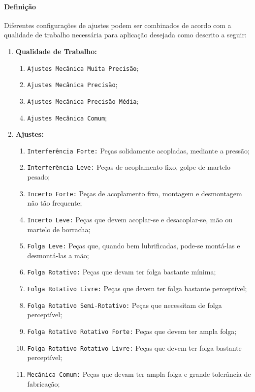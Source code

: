 \documentclass{article}
\begin{document}
            \paragraph{Definição}Diferentes configurações de ajustes podem ser combinados de acordo com a qualidade de trabalho necessária para aplicação desejada como descrito a seguir:
                \begin{enumerate}[noitemsep]
                    \item \textbf{Qualidade de Trabalho:}
                        \begin{enumerate}[noitemsep]
                            \item \texttt{Ajustes Mecânica Muita Precisão};
                            \item \texttt{Ajustes Mecânica Precisão};
                            \item \texttt{Ajustes Mecânica Precisão Média};
                            \item \texttt{Ajustes Mecânica Comum};
                        \end{enumerate}
                    \item \textbf{Ajustes:}
                        \begin{enumerate}[noitemsep]
                            \item \texttt{Interferência Forte:} Peças solidamente acopladas, mediante a pressão;
                            \item \texttt{Interferência Leve:} Peças de acoplamento fixo, golpe de martelo pesado;\vspace{5mm}
                            \item \texttt{Incerto Forte:} Peças de acoplamento fixo, montagem e desmontagem não tão frequente;
                            \item \texttt{Incerto Leve:} Peças que devem acoplar-se e desacoplar-se, mão ou martelo de borracha;\vspace{5mm}
                            \item \texttt{Folga Leve:} Peças que, quando bem lubrificadas, pode-se montá-las e desmontá-las a mão;
                            \item \texttt{Folga Rotativo:} Peças que devam ter folga bastante mínima;
                            \item \texttt{Folga Rotativo Livre:} Peças que devem ter folga bastante perceptível;
                            \item \texttt{Folga Rotativo Semi-Rotativo:} Peças que necessitam de folga perceptível;
                            \item \texttt{Folga Rotativo Rotativo Forte:} Peças que devem ter ampla folga;
                            \item \texttt{Folga Rotativo Rotativo Livre:} Peças que devem ter folga bastante perceptível;\vspace{5mm}
                            \item \texttt{Mecânica Comum:} Peças que devam ter ampla folga e grande tolerância de fabricação;
                        \end{enumerate}
                \end{enumerate}
\end{document}
